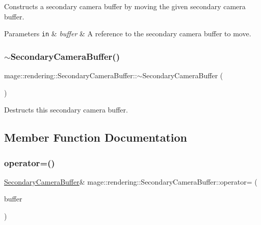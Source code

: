 Constructs a secondary camera buffer by moving the given secondary camera buffer.


\begin{DoxyParams}[1]{Parameters}
\mbox{\tt in}  & {\em buffer} & A reference to the secondary camera buffer to move. \\
\hline
\end{DoxyParams}
\hypertarget{structmage_1_1rendering_1_1_secondary_camera_buffer_a0ee38cfcaf0cb5961ffc1c37fcb71b3f}{}\label{structmage_1_1rendering_1_1_secondary_camera_buffer_a0ee38cfcaf0cb5961ffc1c37fcb71b3f} 
\subsubsection{\texorpdfstring{$\sim$\+Secondary\+Camera\+Buffer()}{~SecondaryCameraBuffer()}}
{\footnotesize\ttfamily mage\+::rendering\+::\+Secondary\+Camera\+Buffer\+::$\sim$\+Secondary\+Camera\+Buffer (\begin{DoxyParamCaption}{ }\end{DoxyParamCaption})\hspace{0.3cm}{\ttfamily [default]}}

Destructs this secondary camera buffer. 

\subsection{Member Function Documentation}
\hypertarget{structmage_1_1rendering_1_1_secondary_camera_buffer_ad26ba75c577c29c131aeab66a22444bd}{}\label{structmage_1_1rendering_1_1_secondary_camera_buffer_ad26ba75c577c29c131aeab66a22444bd} 
\subsubsection{\texorpdfstring{operator=()}{operator=()}\hspace{0.1cm}{\footnotesize\ttfamily [1/2]}}
{\footnotesize\ttfamily \hyperlink{structmage_1_1rendering_1_1_secondary_camera_buffer}{Secondary\+Camera\+Buffer}\& mage\+::rendering\+::\+Secondary\+Camera\+Buffer\+::operator= (\begin{DoxyParamCaption}\item[{const \hyperlink{structmage_1_1rendering_1_1_secondary_camera_buffer}{Secondary\+Camera\+Buffer} \&}]{buffer }\end{DoxyParamCaption})\hspace{0.3cm}{\ttfamily [default]}}

